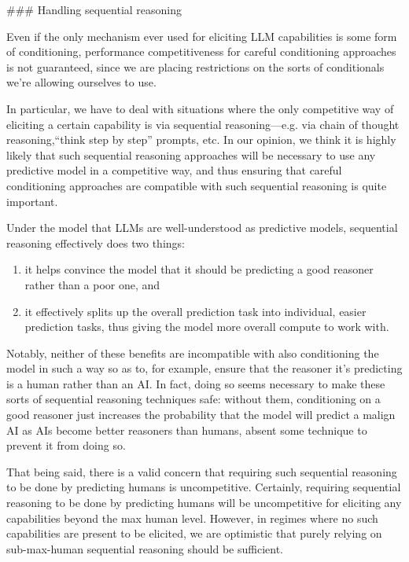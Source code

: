 {### Handling sequential reasoning

Even if the only mechanism ever used for eliciting LLM capabilities is some form of conditioning, performance competitiveness for careful conditioning approaches is not guaranteed, since we are placing restrictions on the sorts of conditionals we're allowing ourselves to use.

In particular, we have to deal with situations where the only competitive way of eliciting a certain capability is via sequential reasoning---e.g. via chain of thought reasoning,``think step by step\cite{TODO: cite https://twitter.com/arankomatsuzaki/status/1529278580189908993}'' prompts, etc. In our opinion, we think it is highly likely that such sequential reasoning approaches will be necessary to use any predictive model in a competitive way, and thus ensuring that careful conditioning approaches are compatible with such sequential reasoning is quite important.

Under the model that LLMs are well-understood as predictive models, sequential reasoning effectively does two things:



\begin{enumerate}
\item it helps convince the model that it should be predicting a good reasoner rather than a poor one, and
\item it effectively splits up the overall prediction task into individual, easier prediction tasks, thus giving the model more overall compute to work with.
\end{enumerate}

Notably, neither of these benefits are incompatible with also conditioning the model in such a way so as to, for example, ensure that the reasoner it's predicting is a human rather than an AI. In fact, doing so seems necessary to make these sorts of sequential reasoning techniques safe: without them, conditioning on a good reasoner just increases the probability that the model will predict a malign AI as AIs become better reasoners than humans, absent some technique to prevent it from doing so.

That being said, there is a valid concern that requiring such sequential reasoning to be done by predicting humans is uncompetitive. Certainly, requiring sequential reasoning to be done by predicting humans will be uncompetitive for eliciting any capabilities beyond the max human level. However, in regimes where no such capabilities are present to be elicited, we are optimistic that purely relying on sub-max-human sequential reasoning should be sufficient.

}
